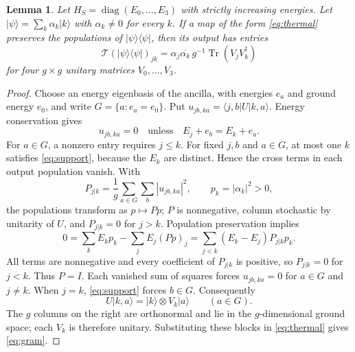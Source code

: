 \documentclass[11pt]{article}
\newtheorem{lemma}{Lemma}
\newcommand{\Tr}{\operatorname{Tr}}
\newcommand{\diag}{\operatorname{diag}}
\newcommand{\ket}[1]{\lvert #1\rangle}
\newcommand{\bra}[1]{\langle #1\rvert}
\begin{document}
\begin{lemma}\label{lem:blocks}
Let $H_S=\diag(E_0,\ldots,E_3)$ with strictly increasing energies. Let
$\ket\psi=\sum_k\alpha_k\ket k$ with $\alpha_k\ne0$ for every $k$.
If a map of the form \eqref{eq:thermal} preserves the populations of
$\ket\psi\bra\psi$, then its output has entries
\begin{equation}\label{eq:gram}
\mathcal T(\ket\psi\bra\psi)_{jk}
=\alpha_j\overline{\alpha_k}\,g^{-1}\Tr(V_jV_k^\dagger)
\end{equation}
for four $g\times g$ unitary matrices $V_0,\ldots,V_3$.
\end{lemma}
\begin{proof}
Choose an energy eigenbasis of the ancilla, with energies $e_a$ and ground
energy $e_0$, and write $G=\{a:e_a=e_0\}$. Put
$u_{jb,ka}=\bra{j,b}U\ket{k,a}$. Energy conservation gives
\begin{equation}\label{eq:support}
u_{jb,ka}=0\quad\text{unless}\quad E_j+e_b=E_k+e_a.
\end{equation}
For $a\in G$, a nonzero entry requires $j\leq k$.
For fixed $j,b$ and $a\in G$,
at most one $k$ satisfies \eqref{eq:support}, because the $E_k$ are distinct.
Hence the cross terms in each output population vanish. With
\[
P_{j|k}=\frac1g\sum_{a\in G}\sum_b|u_{jb,ka}|^2,
\qquad p_k=|\alpha_k|^2>0,
\]
the populations transform as $p\mapsto Pp$; $P$ is nonnegative,
column stochastic by unitarity of $U$, and $P_{j|k}=0$ for $j>k$.
Population preservation implies
\[
0=\sum_kE_kp_k-\sum_jE_j(Pp)_j
=\sum_{j<k}(E_k-E_j)P_{j|k}p_k.
\]
All terms are nonnegative and every coefficient of $P_{j|k}$ is positive,
so $P_{j|k}=0$ for $j<k$. Thus $P=I$. Each vanished sum of squares forces
$u_{jb,ka}=0$ for $a\in G$ and $j\ne k$. When $j=k$,
\eqref{eq:support} forces $b\in G$. Consequently
\[
U\ket{k,a}=\ket k\otimes V_k\ket a\qquad(a\in G).
\]
The $g$ columns on the right are orthonormal and lie in the $g$-dimensional
ground space; each $V_k$ is therefore unitary. Substituting these blocks
in \eqref{eq:thermal} gives \eqref{eq:gram}.
\end{proof}
\end{document}
